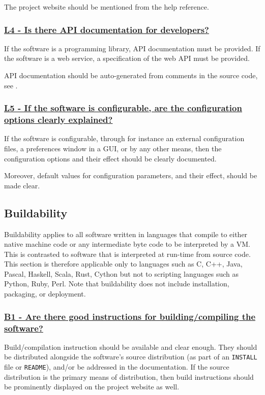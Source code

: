 \documentclass[a4paper,11pt]{article}
\newcommand{\criterion}[2]{\subsubsection*{\underline{#1 - #2}}\label{id:#1}}
\newcommand\CheckTable{%
  \begin{tabular}{ccccc}
    No & Minimal & Adequate & Good & Perfect \\
    0 & 1 & 2 & 3 & 4 \\
    \hline
    $\square$ & $\square$ & $\square$ & $\square$ & $\square$ \\
  \end{tabular}%
}
\newcommand{\refcrit}[1]{%
 \framebox[1.1\width]{\hyperref[id:#1]{#1}}
}
\begin{document}
The project website should be mentioned from the help reference.


\newcommand{\lFourID}{L4}
\newcommand{\lFourText}{Is there API documentation for developers?}
\criterion{\lFourID}{\lFourText}

If the software is a programming library, API documentation must be provided.
If the software is a web service, a specification of the web API must be provided. 

API documentation should be auto-generated from comments in the source code,
see \refcrit{AN3}.


\newcommand{\lFiveID}{L5}
\newcommand{\lFiveText}{If the software is configurable, are the configuration options clearly explained?}
\criterion{\lFiveID}{\lFiveText}

%
%

If the software is configurable, through for instance an external configuration
files, a preferences window in a GUI, or by any other means, then the
configuration options and their effect should be clearly documented.

Moreover, default values for configuration parameters, and their effect, should be
made clear.

\subsection{Buildability}\label{sec:bui}

Buildability applies to all software written in languages that compile to
either native machine code or any intermediate byte code to be interpreted by a VM.
This is contrasted to software that is interpreted at run-time from source
code. This section is therefore applicable only to languages such as C, C++,
Java, Pascal, Haskell, Scala, Rust, Cython but not to scripting languages such
as Python, Ruby, Perl.  Note that buildability does not include
installation, packaging, or deployment.


\newcommand{\bOneID}{B1}
\newcommand{\bOneText}{Are there good instructions for building/compiling the software?}
\criterion{\bOneID}{\bOneText}

Build/compilation instruction should be available and clear enough. They should
be distributed alongside the software's source distribution (as part of an
\texttt{INSTALL} file or \texttt{README}), and/or be addressed in the documentation. If the
source distribution is the primary means of distribution, then build
instructions should be prominently displayed on the project website as well.
\end{document}
